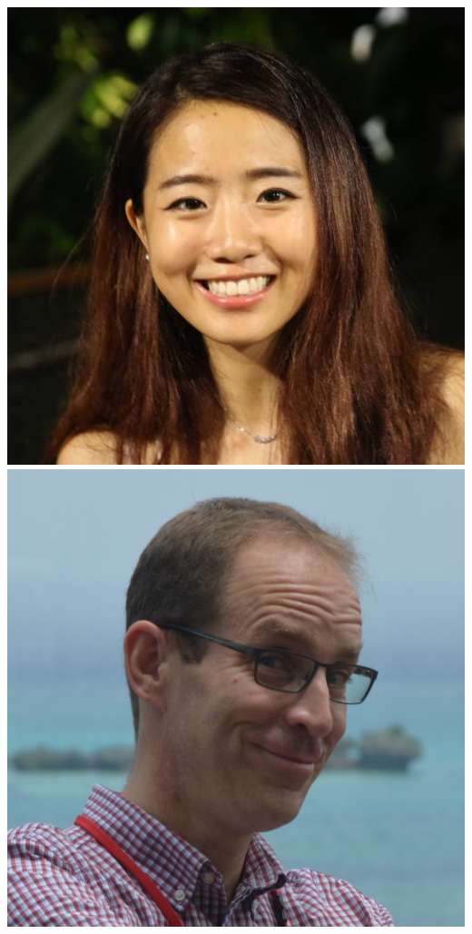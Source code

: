 \documentclass{beamer}
\begin{document}
\begin{frame}
\begin{columns}
\begin{columns}
\includegraphics[width=\textwidth]{TT.jpg}
\includegraphics[width=\textwidth]{TB.JPG}
\end{columns}

\end{columns}
\end{frame}
\end{document}
